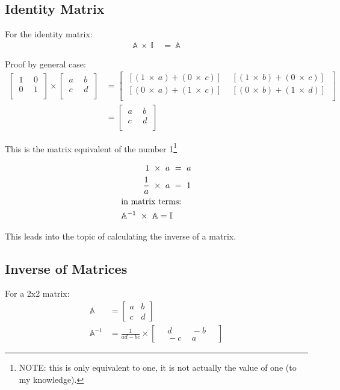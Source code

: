 \subsection{Identity Matrix}
\label{sec:IdentityMatrix}
For the identity matrix:
\begin{align}
  \mathbb{A}~\times~\mathbb{I}~&=~\mathbb{A} \nonumber
\end{align}

Proof by general case:
\begin{align}
  \begin{bmatrix}
    ~1~&~0~\\
    ~0~&~1~\\
  \end{bmatrix}
  \times
  \begin{bmatrix}
    ~a~&~b~\\
    ~c~&~d~\\
  \end{bmatrix}
  &=
  \begin{bmatrix}
    ~[(1~\times~a)+(0~\times~c)]~&~[(1~\times~b)+(0~\times~c)]~\\
    ~[(0~\times~a)+(1~\times~c)]~&~[(0~\times~b)+(1~\times~d)]~\\
  \end{bmatrix}\\
  &=
  \begin{bmatrix}
    ~a~&~b~\\
    ~c~&~d~\\
  \end{bmatrix}
\end{align}

This is the matrix equivalent of the number 1\footnote{NOTE: this is only
equivalent to one, it is not actually the value of one (to my knowledge).}

\begin{align}
  1~\times~a~&=~a \\
  \frac{1}{a}~\times~a~&=~1 \\
  \intertext{in matrix terms:}
  \mathbb{A}^{-1}~\times~\mathbb{A} = \mathbb{I}
\end{align}

This leads into the topic of calculating the inverse of a matrix.

\subsection{Inverse of Matrices}
\label{sec:InverseOfMatrices}
For a 2x2 matrix:
\begin{align}
  \mathbb{A} & = 
    \begin{bmatrix}
      a & b \\
      c & d
    \end{bmatrix}
    \\
  \mathbb{A}^{-1} & =
    \frac{1}{ad-bc} \times
    \begin{bmatrix}
      &~d~&~-b~& \\
      &~-c~&~a~&
    \end{bmatrix}  
\end{align}

